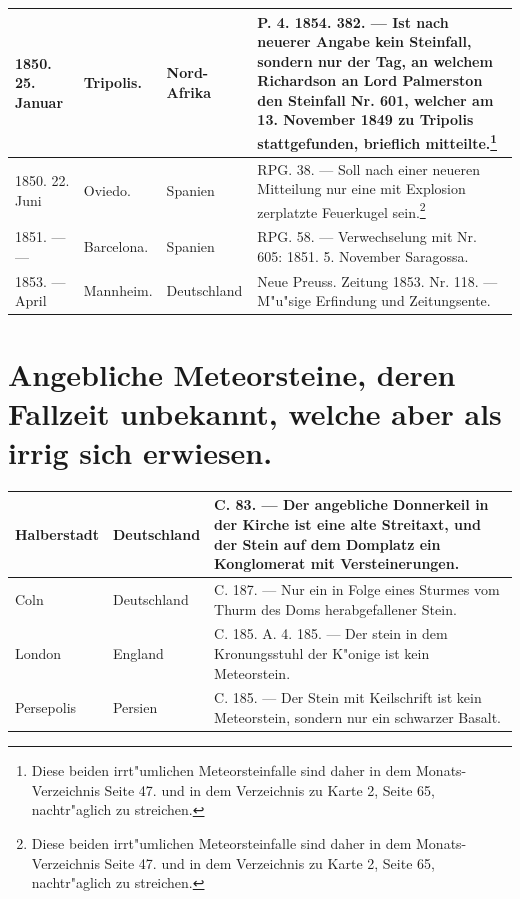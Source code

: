 \documentclass[a4paper, 8pt, oneside, polutonikogreek, german]{article}
\begin{document}
\begin{center}
\begin{longtable}{| p{20mm} | p{25mm} | p{20mm} | p{55mm} |}
        1850. 25. Januar & Tripolis. & Nord-Afrika & P. 4. 1854. 382. --- Ist nach neuerer Angabe kein Steinfall, sondern nur der Tag, an welchem Richardson an Lord Palmerston den Steinfall Nr. 601, welcher am 13. November 1849 zu Tripolis stattgefunden, brieflich mitteilte.\footnote{Diese beiden irrt"umlichen Meteorsteinfalle sind daher in dem Monats-Verzeichnis Seite 47. und in dem Verzeichnis zu Karte 2, Seite 65, nachtr"aglich zu streichen.} \\ \hline
        1850. 22. Juni & Oviedo. & Spanien & RPG. 38. --- Soll nach einer neueren Mitteilung nur eine mit Explosion zerplatzte Feuerkugel sein.\footnote{Diese beiden irrt"umlichen Meteorsteinfalle sind daher in dem Monats-Verzeichnis Seite 47. und in dem Verzeichnis zu Karte 2, Seite 65, nachtr"aglich zu streichen.} \\ \hline
        1851. --- --- & Barcelona. & Spanien & RPG. 58. --- Verwechselung mit Nr. 605: 1851. 5. November Saragossa. \\ \hline
        1853. --- April & Mannheim. & Deutschland & Neue Preuss. Zeitung 1853. Nr. 118. --- M"u"sige Erfindung und Zeitungsente. \\ \hline
    \end{longtable}
\end{center}
\clearpage
\section{Angebliche Meteorsteine, deren Fallzeit unbekannt, welche aber als irrig sich erwiesen.}
\begin{table}[H]
    \centering
    \footnotesize
    \begin{longtable}{|l|l|p{55mm}|}
    \hline
        Halberstadt & Deutschland & C. 83. --- Der angebliche Donnerkeil in der Kirche ist eine alte Streitaxt, und der Stein auf dem Domplatz ein Konglomerat mit Versteinerungen. \\ \hline
        Coln & Deutschland & C. 187. --- Nur ein in Folge eines Sturmes vom Thurm des Doms herabgefallener Stein. \\ \hline
        London & England & C. 185. A. 4. 185. --- Der stein in dem Kronungsstuhl der K"onige ist kein Meteorstein. \\ \hline
        Persepolis & Persien & C. 185. --- Der Stein mit Keilschrift ist kein Meteorstein, sondern nur ein schwarzer Basalt. \\ \hline
    \end{longtable}
\end{table}
\clearpage
\end{document}
